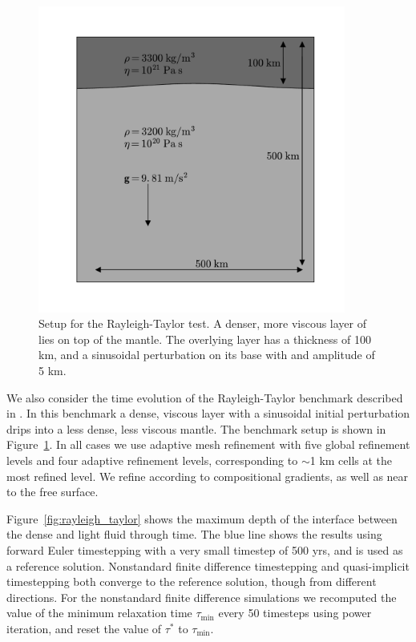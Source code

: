 \documentclass[preprint,12pt,authoryear]{elsarticle}
\begin{document}
\begin{figure}
\includegraphics[width=0.9\textwidth]{figures/rayleigh_taylor_setup.pdf}
\caption{Setup for the Rayleigh-Taylor test. A denser, more viscous layer of lies on top of the mantle. The overlying layer has a thickness of 100 km, and a sinusoidal perturbation on its base with and amplitude of 5 km.}
\label{fig:rayleigh_taylor_setup}
\end{figure}

We also consider the time evolution of the Rayleigh-Taylor benchmark described in \citet{kaus2010stabilization}.
In this benchmark a dense, viscous layer with a sinusoidal initial perturbation drips into a less dense, less viscous mantle.
The benchmark setup is shown in Figure~\ref{fig:rayleigh_taylor_setup}.
In all cases we use adaptive mesh refinement with five global refinement levels and four adaptive refinement levels,
corresponding to $\sim$1 km cells at the most refined level. We refine according to compositional gradients, as well as
near to the free surface.

Figure~\ref{fig:rayleigh_taylor} shows the maximum depth of the interface between the dense and light fluid through time.
The blue line shows the results using forward Euler timestepping with a very small timestep of 500 yrs, and is used as a reference solution.
Nonstandard finite difference timestepping and quasi-implicit timestepping both converge to the reference solution,
though from different directions.
For the nonstandard finite difference simulations we recomputed the value of the minimum relaxation time $\tau_\mathrm{min}$ 
every 50 timesteps using power iteration, and reset the value of $\tau^*$ to $\tau_\mathrm{min}$.
\end{document}
